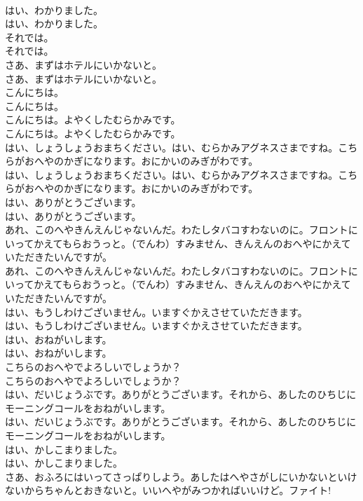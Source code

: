 \documentclass[8pt]{extreport}
\begin{document}
\begin{CJK}{UTF8}{min}
\\	はい、わかりました。	
\\	はい、わかりました。 
\\	それでは。	
\\	それでは。 
\\	さあ、まずはホテルにいかないと。	
\\	さあ、まずはホテルにいかないと。 
\\	こんにちは。	
\\	こんにちは。 
\\	こんにちは。よやくしたむらかみです。	
\\	こんにちは。よやくしたむらかみです。 
\\	はい、しょうしょうおまちください。はい、むらかみアグネスさまですね。こちらがおへやのかぎになります。おにかいのみぎがわです。	
\\	はい、しょうしょうおまちください。はい、むらかみアグネスさまですね。こちらがおへやのかぎになります。おにかいのみぎがわです。 
\\	はい、ありがとうございます。	
\\	はい、ありがとうございます。 
\\	あれ、このへやきんえんじゃないんだ。わたしタバコすわないのに。フロントにいってかえてもらおうっと。（でんわ）すみません、きんえんのおへやにかえていただきたいんですが。	
\\	あれ、このへやきんえんじゃないんだ。わたしタバコすわないのに。フロントにいってかえてもらおうっと。（でんわ）すみません、きんえんのおへやにかえていただきたいんですが。 
\\	はい、もうしわけございません。いますぐかえさせていただきます。	
\\	はい、もうしわけございません。いますぐかえさせていただきます。 
\\	はい、おねがいします。	
\\	はい、おねがいします。 
\\	こちらのおへやでよろしいでしょうか？	
\\	こちらのおへやでよろしいでしょうか？ 
\\	はい、だいじょうぶです。ありがとうございます。それから、あしたのひちじにモーニングコールをおねがいします。	
\\	はい、だいじょうぶです。ありがとうございます。それから、あしたのひちじにモーニングコールをおねがいします。 
\\	はい、かしこまりました。	
\\	はい、かしこまりました。 
\\	さあ、おふろにはいってさっぱりしよう。あしたはへやさがしにいかないといけないからちゃんとおきないと。いいへやがみつかればいいけど。ファイト!	

\end{CJK}
\end{document}
